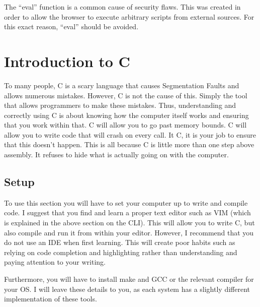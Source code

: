 			The ``eval'' function is a common cause of security flaws. 
			This was created in order to allow the browser to execute arbitrary scripts from external sources. 
			For this exact reason, ``eval'' should be avoided. 
	\section{Introduction to C}
		To many people, C is a scary language that causes Segmentation Faults and allows numerous mistakes. 
		However, C is not the cause of this. Simply the tool that allows programmers to make these mistakes. 
		Thus, understanding and correctly using C is about knowing how the computer itself works and ensuring that you work within that. 
		C will allow you to go past memory bounds. 
		C will allow you to write code that will crash on every call. 
		It C, it is your job to ensure that this doesn't happen. 
		This is all because C is little more than one step above assembly. 
		It refuses to hide what is actually going on with the computer. 

		\subsection{Setup}
			To use this section you will have to set your computer up to write and compile code. 
			I suggest that you find and learn a proper text editor such as VIM (which is explained in the above section on the CLI).
			This will allow you to write C, but also compile and run it from within your editor. 
			However, I recommend that you do not use an IDE when first learning. 
			This will create poor habits such as relying on code completion and highlighting rather than understanding and paying attention to your writing. 

			Furthermore, you will have to install make and GCC or the relevant compiler for your OS. 
			I will leave these details to you, as each system has a slightly different implementation of these tools. 

